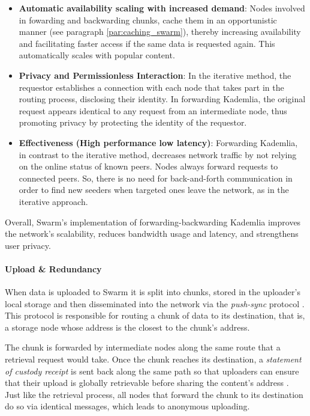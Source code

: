 \begin{itemize}
    \item \textbf{Automatic availability scaling with increased demand}: Nodes involved in fowarding and backwarding chunks, cache them in an opportunistic manner (see paragraph \ref{par:caching_swarm}), thereby increasing availability and facilitating faster access if the same data is requested again. This automatically scales with popular content. 
    \item \textbf{Privacy and Permissionless Interaction}: In the iterative method, the requestor establishes a connection with each node that takes part in the routing process, disclosing their identity. In forwarding Kademlia, the original request appears identical to any request from an intermediate node, thus promoting privacy by protecting the identity of the requestor.
    \item \textbf{Effectiveness (High performance low latency)}: Forwarding Kademlia, in contrast to the iterative method, decreases network traffic by not relying on the online status of known peers. Nodes always forward requests to connected peers. So, there is no need for back-and-forth communication in order to find new seeders when targeted ones leave the network, as in the iterative approach.
\end{itemize}

Overall, Swarm's implementation of forwarding-backwarding Kademlia improves the network's scalability, reduces bandwidth usage and latency, and strengthens user privacy.

\paragraph{Upload \& Redundancy}\label{par:upload_swarm}
When data is uploaded to Swarm it is split into chunks, stored in the uploader's local storage and then disseminated into the network via the \textit{push-sync} protocol \citep{swarm_team_2021}. This protocol is responsible for routing a chunk of data to its destination, that is, a storage node whose address is the closest to the chunk's address.

The chunk is forwarded by intermediate nodes along the same route that a retrieval request would take. Once the chunk reaches its destination, a \textit{statement of custody receipt} is sent back along the same path so that uploaders can ensure that their upload is globally retrievable before sharing the content's address \citep[p.~47]{tron_2020}. Just like the retrieval process, all nodes that forward the chunk to its destination do so via identical messages, which leads to anonymous uploading.

